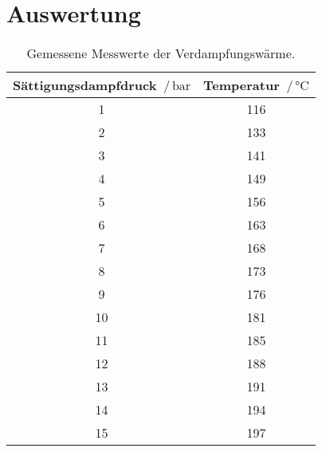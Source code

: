 \section{Auswertung}
\label{sec:Auswertung}


\begin{table}[H]
  \centering
  \caption{Gemessene Messwerte der Verdampfungswärme.}
  \label{tab:werte1}
  \begin{tabular}{c c}
    \toprule
    Sättigungsdampfdruck $\,/\,\si{\bar}$ & Temperatur $\,/\, \si{\celsius}$ \\
    \midrule
    1 & 116 \\
    2 & 133 \\
    3 & 141 \\
    4 & 149 \\
    5 & 156 \\
    6 & 163 \\
    7 & 168 \\
    8 & 173 \\
    9 & 176 \\
    10 & 181 \\
    11 & 185 \\
    12 & 188 \\
    13 & 191 \\
    14 & 194 \\
    15 & 197 \\
    \bottomrule
  \end{tabular}
\end{table}